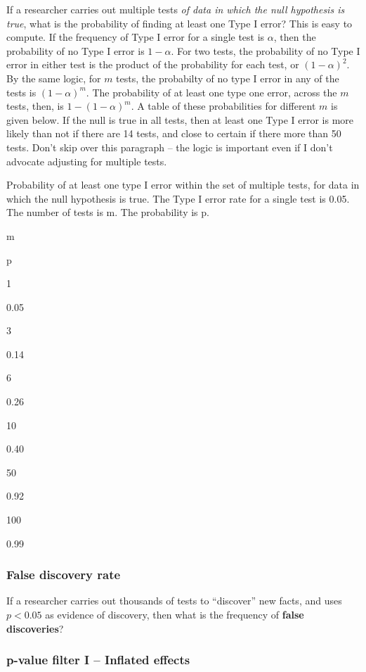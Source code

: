 \documentclass[]{book}
\begin{document}
If a researcher carries out multiple tests \emph{of data in which the null hypothesis is true}, what is the probability of finding at least one Type I error? This is easy to compute. If the frequency of Type I error for a single test is \(\alpha\), then the probability of no Type I error is \(1 - \alpha\). For two tests, the probability of no Type I error in either test is the product of the probability for each test, or \((1 - \alpha)^2\). By the same logic, for \(m\) tests, the probabilty of no type I error in any of the tests is \((1 - \alpha)^m\). The probability of at least one type one error, across the \(m\) tests, then, is \(1 - (1 - \alpha)^m\). A table of these probabilities for different \(m\) is given below. If the null is true in all tests, then at least one Type I error is more likely than not if there are 14 tests, and close to certain if there more than 50 tests. Don't skip over this paragraph -- the logic is important even if I don't advocate adjusting for multiple tests.

\label{tab:best-type1-table}Probability of at least one type I error within the set of multiple tests, for data in which the null hypothesis is true. The Type I error rate for a single test is 0.05. The number of tests is m. The probability is p.

m

p

1

0.05

3

0.14

6

0.26

10

0.40

50

0.92

100

0.99

\hypertarget{false-discovery-rate}{%
\subsubsection{False discovery rate}\label{false-discovery-rate}}

If a researcher carries out thousands of tests to ``discover'' new facts, and uses \(p < 0.05\) as evidence of discovery, then what is the frequency of \textbf{false discoveries}?

\hypertarget{p-value-filter-i-inflated-effects}{%
\subsubsection{p-value filter I -- Inflated effects}\label{p-value-filter-i-inflated-effects}}
\end{document}
